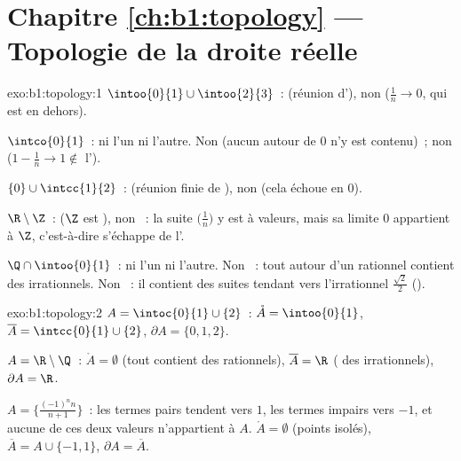 \section*{Chapitre \ref{ch:b1:topology} --- Topologie de la droite réelle}

\begin{solution}{exo:b1:topology:1}
$\intoo{0}{1} \cup \intoo{2}{3}$~:  (réunion d'), non
 ($\frac 1n \to 0$, qui est en dehors).

$\intco{0}{1}$~: ni l'un ni l'autre. Non  (aucun 
autour de $0$ n'y est contenu)~; non  ($1 - \frac1n \to 1 \notin$
l').

$\{0\} \cup \intcc{1}{2}$~:  (réunion finie de ), non
 (cela échoue en $0$).

$\R \setminus \Z$~:  ($\Z$ est ), non ~: la suite
$\bigl(\frac 1n\bigr)$ y est à valeurs, mais sa limite $0$ appartient
à $\Z$, c'est-à-dire s'échappe de l'.

$\Q \cap \intoo{0}{1}$~: ni l'un ni l'autre. Non ~: tout
 autour d'un rationnel contient des irrationnels. Non
~: il contient des suites tendant vers l'irrationnel
$\frac{\sqrt 2}{2}$ ().
\end{solution}

\begin{solution}{exo:b1:topology:2}
$A = \intoc{0}{1} \cup \{2\}$~: $\mathring A = \intoo{0}{1}$,
$\overline A = \intcc{0}{1} \cup \{2\}$, $\partial A = \{0, 1, 2\}$.

$A = \R \setminus \Q$~: $\mathring A = \emptyset$ (tout 
contient des rationnels), $\overline A = \R$ ( des
irrationnels), $\partial A = \R$.

$A = \bigl\{\frac{(-1)^n n}{n+1}\bigr\}$~: les termes pairs tendent
vers $1$, les termes impairs vers $-1$, et aucune de ces deux valeurs
n'appartient à $A$. $\mathring A = \emptyset$ (points isolés),
$\overline A = A \cup \{-1, 1\}$, $\partial A = \overline A$.
\end{solution}


